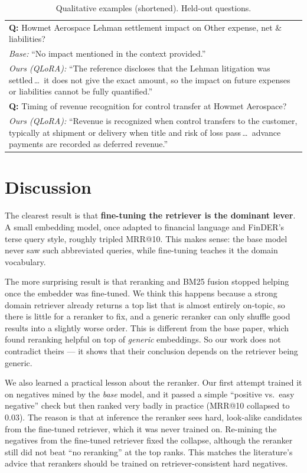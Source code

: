 \documentclass[conference]{IEEEtran}
\begin{document}
\begin{table}[t]
\caption{Qualitative examples (shortened). Held-out questions.}
\label{tab:qual}
\centering
\small
\begin{tabular}{p{}}
\toprule
\textbf{Q:} Howmet Aerospace Lehman settlement impact on Other expense, net \& liabilities? \\
\textit{Base:} ``No impact mentioned in the context provided.'' \\
\textit{Ours (QLoRA):} ``The reference discloses that the Lehman litigation was settled\,\ldots\ it does not give the exact amount, so the impact on future expenses or liabilities cannot be fully quantified.'' \\
\midrule
\textbf{Q:} Timing of revenue recognition for control transfer at Howmet Aerospace? \\
\textit{Ours (QLoRA):} ``Revenue is recognized when control transfers to the customer, typically at shipment or delivery when title and risk of loss pass\,\ldots\ advance payments are recorded as deferred revenue.'' \\
\bottomrule
\end{tabular}
\end{table}

\section{Discussion}
\label{sec:disc}
The clearest result is that \textbf{fine-tuning the retriever is the dominant lever}. A small embedding
model, once adapted to financial language and FinDER's terse query style, roughly tripled MRR@10. This
makes sense: the base model never saw such abbreviated queries, while fine-tuning teaches it the domain
vocabulary.

The more surprising result is that reranking and BM25 fusion stopped helping once the embedder was
fine-tuned. We think this happens because a strong domain retriever already returns a top list that is
almost entirely on-topic, so there is little for a reranker to fix, and a generic reranker can only
shuffle good results into a slightly worse order. This is different from the base paper, which found
reranking helpful on top of \emph{generic} embeddings. So our work does not contradict theirs --- it shows
that their conclusion depends on the retriever being generic.

We also learned a practical lesson about the reranker. Our first attempt trained it on negatives mined by
the \emph{base} model, and it passed a simple ``positive vs.\ easy negative'' check but then ranked very
badly in practice (MRR@10 collapsed to 0.03). The reason is that at inference the reranker sees hard,
look-alike candidates from the fine-tuned retriever, which it was never trained on. Re-mining the
negatives from the fine-tuned retriever fixed the collapse, although the reranker still did not beat
``no reranking'' at the top ranks. This matches the literature's advice that rerankers should be trained
on retriever-consistent hard negatives.
\end{document}
